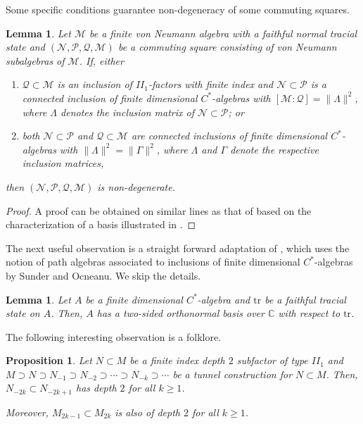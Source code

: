 \documentclass{amsart}
\newtheorem{proposition}[theorem]{Proposition}
\newtheorem{lemma}[theorem]{Lemma}
\theoremstyle{definition}
\theoremstyle{theorem}
\newcommand{\C}{\mathbb{C}}
\newcommand{\tr}{\mathrm{tr}}
\begin{document}
Some specific conditions guarantee  non-degeneracy of some commuting squares.

\begin{lemma}\label{non-degenerate}
  Let $\mathcal{M}$ be a finite von Neumann algebra with a faithful
  normal tracial state and $(\mathcal{N}, \mathcal{P}, \mathcal{Q},
  \mathcal{M})$ be a commuting square consisting of von Neumann
  subalgebras of $\mathcal{M}$.  If, either
  \begin{enumerate}
\item $\mathcal{Q}\subset \mathcal{M}$ is an inclusion of
  $II_1$-factors with finite index and $\mathcal{N}\subset \mathcal{P}$ is a connected
  inclusion of finite dimensional $C^*$-algebras with
  \( [\mathcal{M}  : \mathcal{Q}] =\|\Lambda\|^2\),
  where $\Lambda$ denotes the
  inclusion matrix of $\mathcal{N}\subset \mathcal{P}$; or
  \item both $\mathcal{N}\subset \mathcal{P}$ and $\mathcal{Q}\subset
    \mathcal{M}$ are connected inclusions of finite dimensional
    $C^*$-algebras with \(  \|\Lambda\|^2=\|\Gamma\|^2\), where
     $\Lambda$  and  $\Gamma$ denote the respective inclusion matrices,
\end{enumerate}
  then $(\mathcal{N}, \mathcal{P}, \mathcal{Q}, \mathcal{M})$ is
  non-degenerate.  
\end{lemma}
\begin{proof}
A proof  can be obtained on similar lines as
that of \cite[Lemma 18]{BK}  based on the characterization of a basis illustrated in \cite[Theorem 2.2]{B}.  \end{proof}


\color{black} The next useful observation is a straight forward adaptation of
\cite[Proposition 3.3]{BG}, which uses the notion of path algebras
associated to inclusions of finite dimensional $C^*$-algebras by
Sunder and Ocneanu. We skip the details. 
\begin{lemma}\cite{BG} \label{path-algebra-result}
Let $A$ be a finite dimensional $C^*$-algebra and $\tr$ be a faithful
tracial state on $A$. Then, $A$ has a two-sided orthonormal basis over
$\C$ with respect to $\tr$.
\end{lemma}



The following interesting observation is a folklore.
\begin{proposition}\label{downward depth}
  Let $N\subset M$ be a finite index depth $2$ subfactor of type $II_1$ and $M
  \supset N \supset N_{-1}\supset N_{-2}\supset \cdots \supset N_{-k}
  \supset \cdots$ be a tunnel construction for $N \subset M$. Then,
  $N_{-2k}\subset N_{-2k +1}$ has depth $2$ for all $k \geq 1$.

Moreover, $M_{2k-1} \subset M_{2k}$ is also of depth $2$ for all $ k\geq 1$.
\end{proposition}
\end{document}
